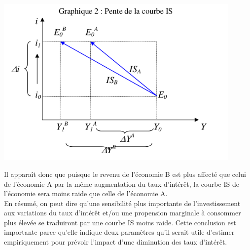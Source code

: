 \documentclass[10pt]{book}
\begin{document}
\begin{center}
  \includegraphics[width=12cm]{graph24.png}
\end{center}
Il apparaît donc que puisque le revenu de l'économie B est plus affecté que celui de l'économie A par la même augmentation du taux d'intérêt, la courbe IS de l'économie sera moins raide que celle de l'économie A. \\
En résumé, on peut dire qu'une sensibilité plus importante de l'investissement aux variations du taux d'intérêt et/ou une propension marginale à consommer plus élevée se traduiront par une courbe IS moins raide. Cette conclusion est importante parce qu'elle indique deux paramètres qu'il serait utile d'estimer empiriquement pour prévoir l'impact d'une diminution des taux d'intérêt.
\end{document}
